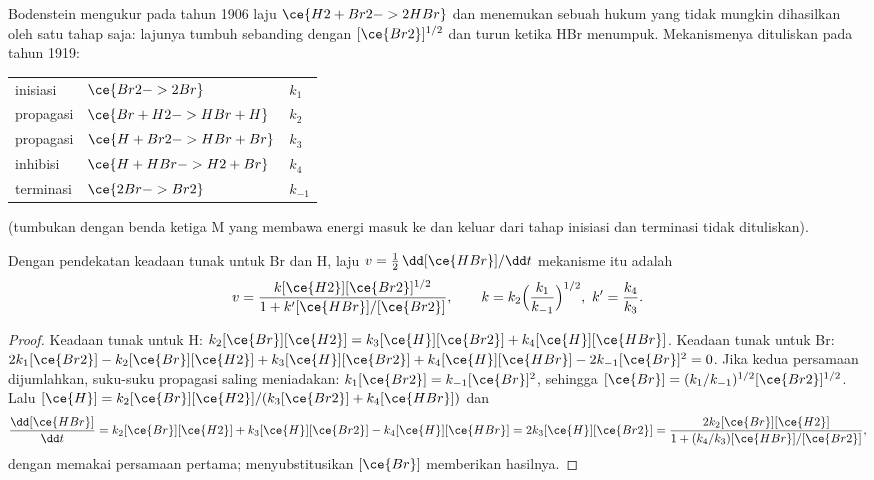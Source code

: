 Bodenstein mengukur pada tahun 1906 laju $\ce{H2 + Br2 -> 2 HBr}$ dan menemukan
sebuah hukum yang tidak mungkin dihasilkan oleh satu tahap saja: lajunya
tumbuh sebanding dengan $[\ce{Br2}]^{1/2}$ dan turun ketika HBr menumpuk.
Mekanismenya dituliskan pada tahun 1919:
\begin{center}
\begin{tabular}{lll}
inisiasi & $\ce{Br2 -> 2 Br}$ & $k_1$ \\
propagasi & $\ce{Br + H2 -> HBr + H}$ & $k_2$ \\
propagasi & $\ce{H + Br2 -> HBr + Br}$ & $k_3$ \\
inhibisi & $\ce{H + HBr -> H2 + Br}$ & $k_4$ \\
terminasi & $\ce{2 Br -> Br2}$ & $k_{-1}$
\end{tabular}
\end{center}
(tumbukan dengan benda ketiga M yang membawa energi masuk ke dan keluar dari
tahap inisiasi dan terminasi tidak dituliskan).

\begin{theorem}\label{thm:b3:complex-kinetics:hbr}
Dengan pendekatan keadaan tunak untuk Br dan H, laju
$v = \frac12\,\dd[\ce{HBr}]/\dd t$ mekanisme itu adalah
\[
  v = \frac{k[\ce{H2}][\ce{Br2}]^{1/2}}{1 + k'[\ce{HBr}]/[\ce{Br2}]},
  \qquad k = k_2\Bigl(\frac{k_1}{k_{-1}}\Bigr)^{1/2},\ k' = \frac{k_4}{k_3}.
\]
\end{theorem}

\begin{proof}
Keadaan tunak untuk H: $k_2[\ce{Br}][\ce{H2}] = k_3[\ce{H}][\ce{Br2}] + k_4[\ce{H}][\ce{HBr}]$.
Keadaan tunak untuk Br:
$2k_1[\ce{Br2}] - k_2[\ce{Br}][\ce{H2}] + k_3[\ce{H}][\ce{Br2}] + k_4[\ce{H}][\ce{HBr}] - 2k_{-1}[\ce{Br}]^2 = 0$.
Jika kedua persamaan dijumlahkan, suku-suku propagasi saling meniadakan:
$k_1[\ce{Br2}] = k_{-1}[\ce{Br}]^2$, sehingga $[\ce{Br}] =
(k_1/k_{-1})^{1/2}[\ce{Br2}]^{1/2}$. Lalu $[\ce{H}] = k_2[\ce{Br}][\ce{H2}]/(k_3[\ce{Br2}] + k_4[\ce{HBr}])$ dan
\[
  \frac{\dd[\ce{HBr}]}{\dd t} = k_2[\ce{Br}][\ce{H2}] + k_3[\ce{H}][\ce{Br2}] - k_4[\ce{H}][\ce{HBr}] = 2k_3[\ce{H}][\ce{Br2}]
  = \frac{2k_2[\ce{Br}][\ce{H2}]}{1 + (k_4/k_3)[\ce{HBr}]/[\ce{Br2}]},
\]
dengan memakai persamaan pertama; menyubstitusikan $[\ce{Br}]$ memberikan hasilnya.
\end{proof}

